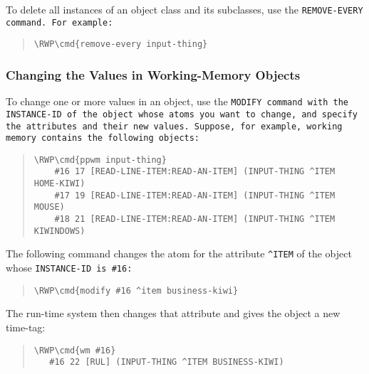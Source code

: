 To delete all instances of an object class and its subclasses, use the
\tt{REMOVE-EVERY} command. For example:

\begin{quote}
\begin{Verbatim}[commandchars=\\\{\}]
\RWP\cmd{remove-every input-thing}
\end{Verbatim}
\end{quote}

\subsubsection{Changing the Values in Working-Memory Objects}

To change one or more values in an object, use the \tt{MODIFY} command with
the \tt{INSTANCE-ID} of the object whose atoms you want to change, and
specify the attributes and their new values.  Suppose, for example,
working memory contains the following objects:

\begin{quote}
\begin{Verbatim}[commandchars=\\\{\}]
\RWP\cmd{ppwm input-thing}
    #16 17 [READ-LINE-ITEM:READ-AN-ITEM] (INPUT-THING ^ITEM HOME-KIWI)
    #17 19 [READ-LINE-ITEM:READ-AN-ITEM] (INPUT-THING ^ITEM MOUSE)
    #18 21 [READ-LINE-ITEM:READ-AN-ITEM] (INPUT-THING ^ITEM KIWINDOWS)
\end{Verbatim}
\end{quote}

The following command changes the atom for the attribute \verb|^ITEM|
of the object whose \tt{INSTANCE-ID} is \verb|#16|:

\begin{quote}
\begin{Verbatim}[commandchars=\\\{\}]
\RWP\cmd{modify #16 ^item business-kiwi}
\end{Verbatim}
\end{quote}

The run-time system then changes that attribute and gives the object a
new time-tag:

\begin{quote}
\begin{Verbatim}[commandchars=\\\{\}]
\RWP\cmd{wm #16}
   #16 22 [RUL] (INPUT-THING ^ITEM BUSINESS-KIWI)
\end{Verbatim}
\end{quote}

